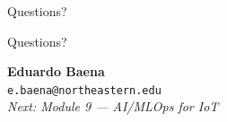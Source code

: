 \documentclass[aspectratio=169,11pt]{beamer}
\begin{document}
\begin{frame}{Questions?}
    \begin{center}
        \Huge Questions?

        \vspace{0.8cm}
        \normalsize
        \textbf{Eduardo Baena}\\
        \texttt{e.baena@northeastern.edu}\\[0.3cm]
        \textit{Next: Module 9 --- AI/MLOps for IoT}
    \end{center}
\end{frame}
\end{document}
